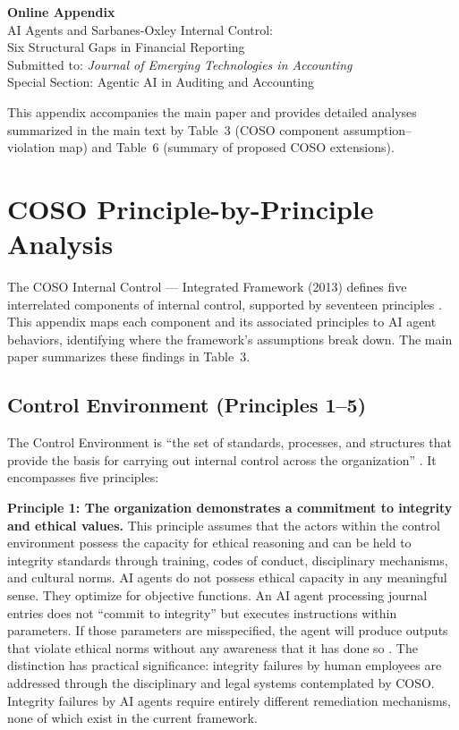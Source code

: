 \documentclass[12pt]{article}
\begin{document}
\begin{center}
{\Large\bfseries Online Appendix}\\[1em]
{\large AI Agents and Sarbanes-Oxley Internal Control:\\
Six Structural Gaps in Financial Reporting}\\[1.5em]
{\normalsize Submitted to: \emph{Journal of Emerging Technologies in Accounting}\\
Special Section: Agentic AI in Auditing and Accounting}
\end{center}

\vspace{2em}

\noindent This appendix accompanies the main paper and provides detailed analyses summarized in the main text by Table~3 (COSO component assumption--violation map) and Table~6 (summary of proposed COSO extensions).

\newpage

\section{COSO Principle-by-Principle Analysis}

The COSO Internal Control --- Integrated Framework (2013) defines five interrelated components of internal control, supported by seventeen principles \citep{coso2013}. This appendix maps each component and its associated principles to AI agent behaviors, identifying where the framework's assumptions break down. The main paper summarizes these findings in Table~3.

\subsection{Control Environment (Principles 1--5)}

The Control Environment is ``the set of standards, processes, and structures that provide the basis for carrying out internal control across the organization'' \citep{coso2013}. It encompasses five principles:

\textbf{Principle 1: The organization demonstrates a commitment to integrity and ethical values.} This principle assumes that the actors within the control environment possess the capacity for ethical reasoning and can be held to integrity standards through training, codes of conduct, disciplinary mechanisms, and cultural norms. AI agents do not possess ethical capacity in any meaningful sense. They optimize for objective functions. An AI agent processing journal entries does not ``commit to integrity'' but executes instructions within parameters. If those parameters are misspecified, the agent will produce outputs that violate ethical norms without any awareness that it has done so \citep{mittelstadt2016}. The distinction has practical significance: integrity failures by human employees are addressed through the disciplinary and legal systems contemplated by COSO. Integrity failures by AI agents require entirely different remediation mechanisms, none of which exist in the current framework.
\end{document}
